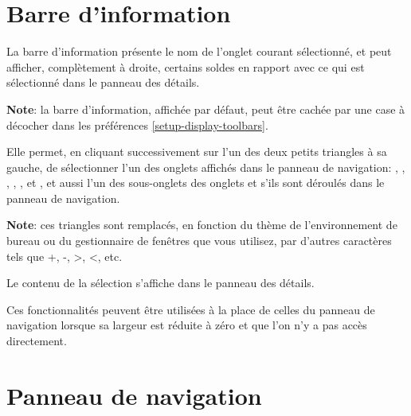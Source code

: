 \section{Barre d'information\label{home-synthesis}}

La barre d'information présente le nom de l'onglet courant sélectionné, et peut afficher, complètement à droite, certains soldes en rapport avec ce qui est sélectionné dans le panneau des détails.


\textbf{Note}: la barre d'information, affichée par défaut, peut être cachée par une case à décocher dans les préférences \vref{setup-display-toolbars}.


Elle permet, en cliquant successivement sur l'un des deux petits triangles à sa gauche, de sélectionner l'un des onglets affichés dans le panneau de navigation: , , , , ,  et , et aussi l'un des sous-onglets des onglets  et  s'ils sont déroulés dans le panneau de navigation.


\textbf{Note}: ces triangles sont remplacés, en fonction du thème de l'environnement de bureau ou du gestionnaire de fenêtres que vous utilisez, par d'autres caractères tels que +, -, >, <, etc.

Le contenu de la sélection s'affiche dans le panneau des détails.

Ces fonctionnalités peuvent être utilisées à la place de celles du panneau de navigation lorsque sa largeur est réduite à zéro et que l'on n'y a pas accès directement.


\section{Panneau de navigation\label{home-accounting}}

